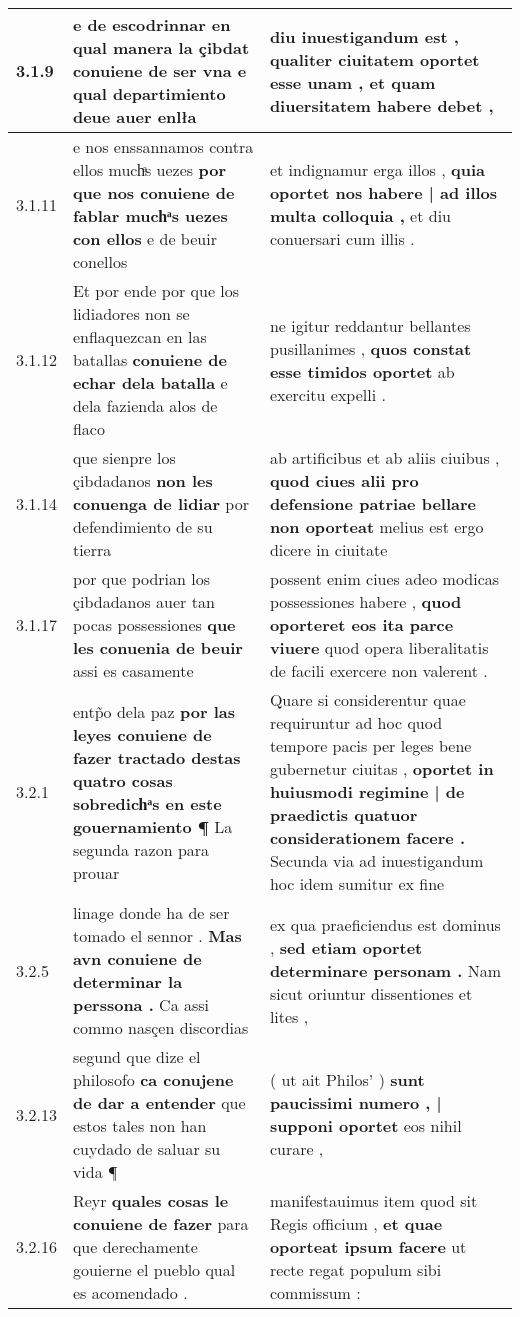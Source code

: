 \begin{tabular}{|p{1cm}|p{6.5cm}|p{6.5cm}|}
3.1.9 & e de escodrinnar \textbf{ en qual manera la çibdat conuiene de ser vna } e qual departimiento deue auer enlła & diu inuestigandum est , \textbf{ qualiter ciuitatem oportet esse unam , } et quam diuersitatem habere debet , \\\hline
3.1.11 & e nos enssannamos contra ellos muchͣs uezes \textbf{ por que nos conuiene de fablar muchͣs uezes con ellos } e de beuir conellos & et indignamur erga illos , \textbf{ quia oportet nos habere | ad illos multa colloquia , } et diu conuersari cum illis . \\\hline
3.1.12 & Et por ende por que los lidiadores non se enflaquezcan en las batallas \textbf{ conuiene de echar dela batalla } e dela fazienda alos de flaco & ne igitur reddantur bellantes pusillanimes , \textbf{ quos constat esse timidos oportet } ab exercitu expelli . \\\hline
3.1.14 & que sienpre los çibdadanos \textbf{ non les conuenga de lidiar } por defendimiento de su tierra & ab artificibus et ab aliis ciuibus , \textbf{ quod ciues alii pro defensione patriae bellare non oporteat } melius est ergo dicere in ciuitate \\\hline
3.1.17 & por que podrian los çibdadanos auer tan pocas possessiones \textbf{ que les conuenia de beuir } assi es casamente & possent enim ciues adeo modicas possessiones habere , \textbf{ quod oporteret eos ita parce viuere } quod opera liberalitatis de facili exercere non valerent . \\\hline
3.2.1 & entp̃o dela paz \textbf{ por las leyes conuiene de fazer tractado destas quatro cosas sobredichͣs en este gouernamiento ¶ } La segunda razon para prouar & Quare si considerentur quae requiruntur ad hoc quod tempore pacis per leges bene gubernetur ciuitas , \textbf{ oportet in huiusmodi regimine | de praedictis quatuor considerationem facere . } Secunda via ad inuestigandum hoc idem sumitur ex fine \\\hline
3.2.5 & linage donde ha de ser tomado el sennor . \textbf{ Mas avn conuiene de determinar la perssona . } Ca assi commo nasçen discordias & ex qua praeficiendus est dominus , \textbf{ sed etiam oportet determinare personam . } Nam sicut oriuntur dissentiones et lites , \\\hline
3.2.13 & segund que dize el philosofo \textbf{ ca conujene de dar a entender } que estos tales non han cuydado de saluar su vida ¶ & ( ut ait Philos’ ) \textbf{ sunt paucissimi numero , | supponi oportet } eos nihil curare , \\\hline
3.2.16 & Reyr \textbf{ quales cosas le conuiene de fazer } para que derechamente gouierne el pueblo qual es acomendado . & manifestauimus item quod sit Regis officium , \textbf{ et quae oporteat ipsum facere } ut recte regat populum sibi commissum : \\\hline

\end{tabular}
